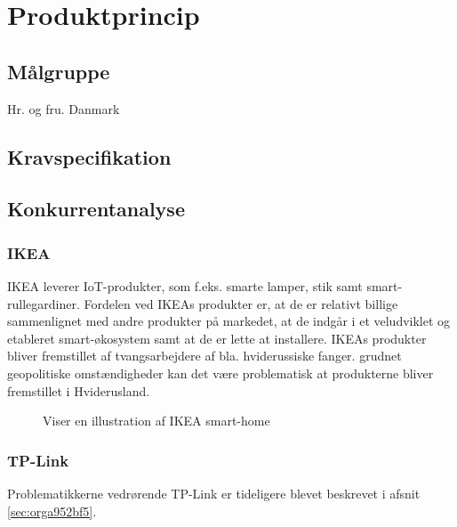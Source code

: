 \documentclass[11pt]{article}
\begin{document}
\section{Produktprincip}
\label{sec:orga77d6f9}

\subsection{Målgruppe}
Hr. og fru. Danmark

\subsection{Kravspecifikation}


\subsection{Konkurrentanalyse}
\subsubsection{IKEA}
IKEA leverer IoT-produkter, som f.eks. smarte lamper, stik samt smart-rullegardiner. Fordelen ved IKEAs produkter er, at de er relativt billige sammenlignet med andre produkter på markedet, at de indgår i et veludviklet og etableret smart-økosystem samt at de er lette at installere.
IKEAs produkter bliver fremstillet af tvangsarbejdere af bla. hviderussiske fanger.  grudnet geopolitiske omstændigheder kan det være problematisk at produkterne bliver fremstillet i Hviderusland.
\begin{figure}[htbp]
\centering
{}
\caption{Viser en illustration af IKEA smart-home}
\end{figure}
\subsubsection{TP-Link}
Problematikkerne vedrørende TP-Link er tideligere blevet beskrevet i afsnit \ref{sec:orga952bf5}.
\end{document}
